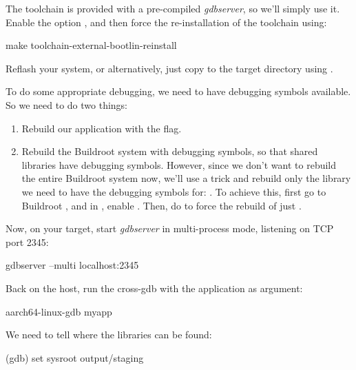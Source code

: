 The toolchain is provided with a pre-compiled {\em gdbserver}, so
we'll simply use it. Enable the option
, and then force the
re-installation of the toolchain using:

\begin{bashinput}
make toolchain-external-bootlin-reinstall
\end{bashinput}

Reflash your system, or alternatively, just copy
 to the target 
directory using .

To do some appropriate debugging, we need to have debugging symbols
available. So we need to do two things:

\begin{enumerate}

\item Rebuild our application with the  flag.

\item Rebuild the Buildroot system with debugging symbols, so that
  shared libraries have debugging symbols. However, since we don't
  want to rebuild the entire Buildroot system now, we'll use a trick
  and rebuild only the library we need to have the debugging symbols
  for: . To achieve this, first go to Buildroot
  , and in , enable
  . Then, do  to force the rebuild of just
  .

\end{enumerate}

Now, on your target, start {\em gdbserver} in multi-process mode,
listening on TCP port 2345:

\begin{bashinput}
gdbserver --multi localhost:2345
\end{bashinput}

Back on the host, run the cross-gdb with the  application
as argument:

\begin{bashinput}
aarch64-linux-gdb myapp
\end{bashinput}

We need to tell  where the libraries can be found:

\begin{bashinput}
(gdb) set sysroot output/staging
\end{bashinput}

